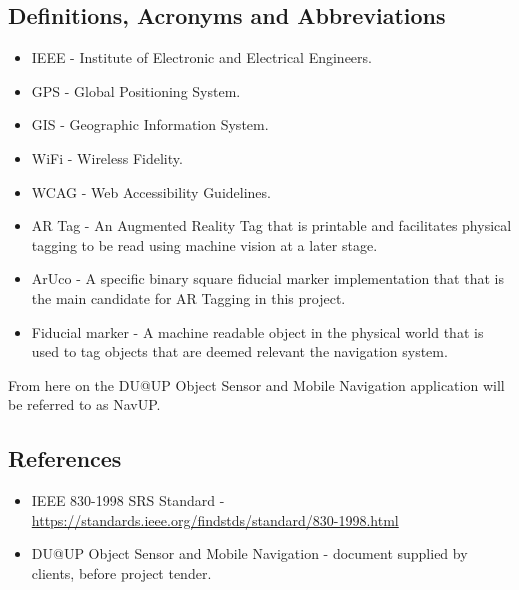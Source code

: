 \documentclass{article}
\begin{document}
		
	\subsection{Definitions, Acronyms and Abbreviations}
		\begin{itemize}
			\item IEEE - Institute of Electronic and Electrical Engineers.
			\item GPS - Global Positioning System.
			\item GIS - Geographic Information System.
			\item WiFi - Wireless Fidelity.
			\item WCAG - Web Accessibility Guidelines.
			\item AR Tag - An Augmented Reality Tag that is printable and facilitates physical tagging to be read using machine vision at a later stage.
			\item ArUco - A specific binary square fiducial marker implementation that that is the main candidate for AR Tagging in this project.
			\item Fiducial marker - A machine readable object in the physical world that is used to tag objects that are deemed relevant the navigation system.
		\end{itemize}
		
		From here on the DU@UP Object Sensor and Mobile Navigation application will be referred to as NavUP.
		
	\subsection{References}
		\begin{itemize}
			\item IEEE 830-1998 SRS Standard - \url{https://standards.ieee.org/findstds/standard/830-1998.html}
			\item DU@UP Object Sensor and Mobile Navigation - document supplied by clients, before project tender.
		\end{itemize}
	
\newpage
%
%	
\end{document}
